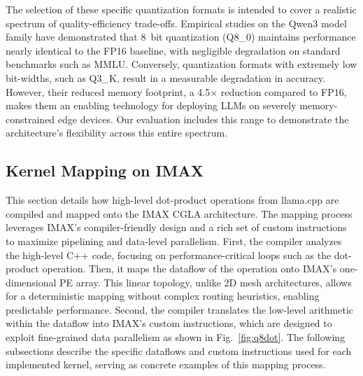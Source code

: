 The selection of these specific quantization formats is intended to cover a realistic spectrum of quality-efficiency trade-offs. 
Empirical studies on the Qwen3 model family have demonstrated that \SI[number-unit-product=\nobreakdash-]{8}{bit} quantization (Q8\_0) maintains performance nearly identical to the FP16 baseline, with negligible degradation on standard benchmarks such as MMLU\cite{qwen3_quantization}. 
Conversely, quantization formats with extremely low bit-widths, such as Q3\_K, result in a measurable degradation in accuracy.
However, their reduced memory footprint, a \num{4.5}$\times$ reduction compared to FP16, makes them an enabling technology for deploying LLMs on severely memory-constrained edge devices. 
Our evaluation includes this range to demonstrate the architecture's flexibility across this entire spectrum.


  

\subsection{Kernel Mapping on IMAX}


This section details how high-level dot-product operations from llama.cpp are compiled and mapped onto the IMAX CGLA architecture. 
The mapping process leverages IMAX's compiler-friendly design and a rich set of custom instructions to maximize pipelining and data-level parallelism.
First, the compiler analyzes the high-level C++ code, focusing on performance-critical loops such as the dot-product operation.
Then, it maps the dataflow of the operation onto IMAX's one-dimensional PE array. 
This linear topology, unlike 2D mesh architectures, allows for a deterministic mapping without complex routing heuristics, enabling predictable performance. 
Second, the compiler translates the low-level arithmetic within the dataflow into IMAX's custom instructions, which are designed to exploit fine-grained data parallelism as shown in Fig.~\ref{fig:q8dot}. 
The following subsections describe the specific dataflows and custom instructions used for each implemented kernel, serving as concrete examples of this mapping process.

